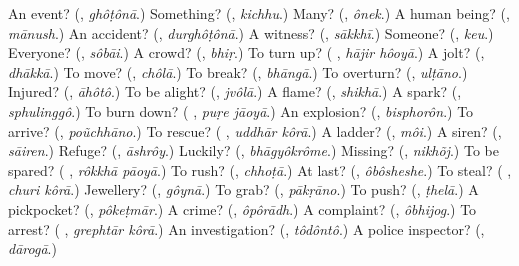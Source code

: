\begin{tcolorbox}[breakable,colback=teal!4,colframe=teal!35!black,title={Before you move on}]
An event? (\textbf{}, \emph{ghôṭônā}.) Something? (\textbf{}, \emph{kichhu}.) Many? (\textbf{}, \emph{ônek}.) A human being? (\textbf{}, \emph{mānush}.) An accident? (\textbf{}, \emph{durghôṭônā}.) A witness? (\textbf{}, \emph{sākkhī}.) Someone? (\textbf{}, \emph{keu}.) Everyone? (\textbf{}, \emph{sôbāi}.) A crowd? (\textbf{}, \emph{bhiṛ}.) To turn up? (\textbf{ }, \emph{hājir hôoyā}.) A jolt? (\textbf{}, \emph{dhākkā}.) To move? (\textbf{}, \emph{chôlā}.) To break? (\textbf{}, \emph{bhāngā}.) To overturn? (\textbf{}, \emph{ulṭāno}.) Injured? (\textbf{}, \emph{āhôtô}.) To be alight? (\textbf{}, \emph{jvôlā}.) A flame? (\textbf{}, \emph{shikhā}.) A spark? (\textbf{}, \emph{sphulinggô}.) To burn down? (\textbf{ }, \emph{puṛe jāoyā}.) An explosion? (\textbf{}, \emph{bisphorôn}.) To arrive? (\textbf{}, \emph{poũchhāno}.) To rescue? (\textbf{ }, \emph{uddhār kôrā}.) A ladder? (\textbf{}, \emph{môi}.) A siren? (\textbf{}, \emph{sāiren}.) Refuge? (\textbf{}, \emph{āshrôy}.) Luckily? (\textbf{}, \emph{bhāgyôkrôme}.) Missing? (\textbf{}, \emph{nikhõj}.) To be spared? (\textbf{ }, \emph{rôkkhā pāoyā}.) To rush? (\textbf{}, \emph{chhoṭā}.) At last? (\textbf{}, \emph{ôbôsheshe}.) To steal? (\textbf{ }, \emph{churi kôrā}.) Jewellery? (\textbf{}, \emph{gôynā}.) To grab? (\textbf{}, \emph{pākṛāno}.) To push? (\textbf{}, \emph{ṭhelā}.) A pickpocket? (\textbf{}, \emph{pôkeṭmār}.) A crime? (\textbf{}, \emph{ôpôrādh}.) A complaint? (\textbf{}, \emph{ôbhijog}.) To arrest? (\textbf{ }, \emph{grephtār kôrā}.) An investigation? (\textbf{}, \emph{tôdôntô}.) A police inspector? (\textbf{}, \emph{dārogā}.)
\end{tcolorbox}
